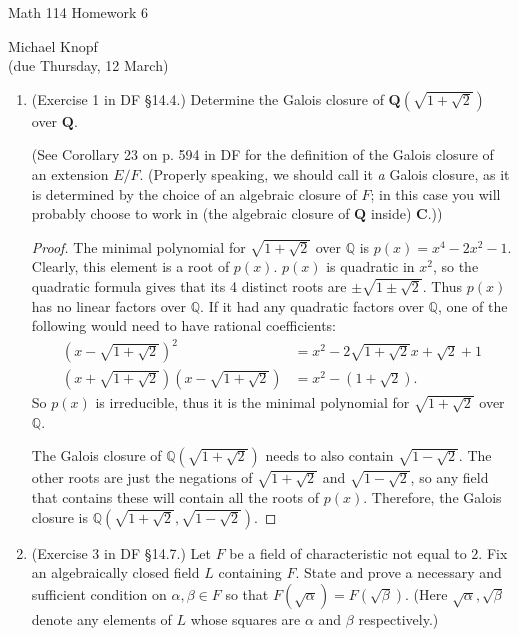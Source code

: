 \documentclass[10pt]{article}
\newcommand{\Q}{\mathbb{Q}}
\begin{document}
\begin{center}
\large Math 114 Homework 6

\normalsize Michael Knopf \\
(due Thursday, 12 March)
\end{center}

\begin{enumerate}

\item (Exercise 1 in DF \S 14.4.) Determine the Galois closure of $\mathbf{Q}(\sqrt{1+\sqrt{2}})$ over $\mathbf{Q}$.

(See Corollary 23 on p. 594 in DF for the definition of the Galois closure of an extension $E/F$.  (Properly speaking, we should call it \emph{a} Galois closure, as it is determined by the choice of an algebraic closure of $F$; in this case you will probably choose to work in (the algebraic closure of $\mathbf{Q}$ inside) $\mathbf{C}$.))

\begin{proof}
The minimal polynomial for $\sqrt{1+\sqrt{2}}$ over $\mathbb{Q}$ is $p(x) = x^4 - 2x^2 - 1$.  Clearly, this element is a root of $p(x)$.  $p(x)$ is quadratic in $x^2$, so the quadratic formula gives that its 4 distinct roots are $\pm \sqrt{1 \pm \sqrt{2}}$.  Thus $p(x)$ has no linear factors over $\Q$.  If it had any quadratic factors over $\Q$, one of the following would need to have rational coefficients:
\begin{align*}
\left( x - \sqrt{1+\sqrt{2}} \right)^2 &= x^2-2 \sqrt{1+\sqrt{2}} x+\sqrt{2}+1
\\
\left( x + \sqrt{1+\sqrt{2}} \right) \left(x - \sqrt{1+\sqrt{2}} \right) &= x^2 - (1 + \sqrt{2}).
\end{align*}
So $p(x)$ is irreducible, thus it is the minimal polynomial for $\sqrt{1+\sqrt{2}}$ over $\Q$.

The Galois closure of $\Q(\sqrt{1+\sqrt{2}})$ needs to also contain $\sqrt{1-\sqrt{2}}$.  The other roots are just the negations of $\sqrt{1+\sqrt{2}}$ and $\sqrt{1-\sqrt{2}}$, so any field that contains these will contain all the roots of $p(x)$.  Therefore, the Galois closure is $\Q(\sqrt{1+\sqrt{2}}, \sqrt{1-\sqrt{2}})$.
\end{proof}

\item (Exercise 3 in DF \S 14.7.) Let $F$ be a field of characteristic not equal to $2$.  Fix an algebraically closed field $L$ containing $F$.  State and prove a necessary and sufficient condition on $\alpha, \beta \in F$ so that $F(\sqrt{\alpha})=F(\sqrt{\beta})$.  (Here $\sqrt{\alpha}, \sqrt{\beta}$ denote any elements of $L$ whose squares are $\alpha$ and $\beta$ respectively.)


\end{enumerate}
\end{document}
